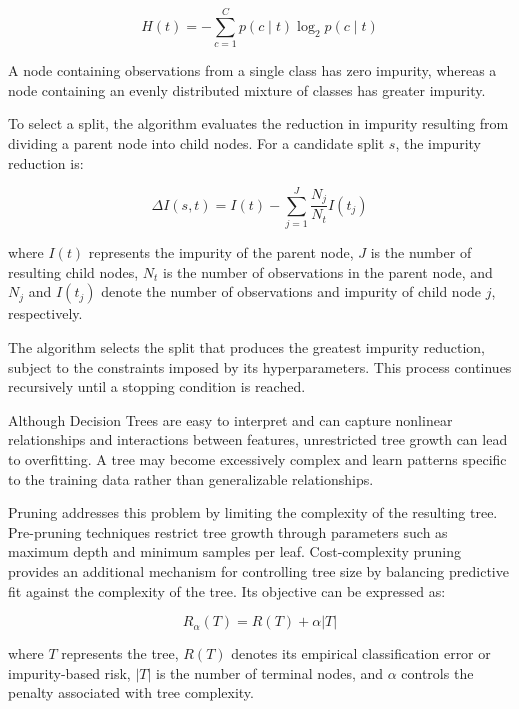 \begin{equation}
    H(t)
    =
    -\sum_{c=1}^{C}
    p(c\mid t)\log_2 p(c\mid t)
    \label{eq:entropy}
\end{equation}

A node containing observations from a single class has zero impurity, whereas a node containing an evenly distributed mixture of classes has greater impurity.

To select a split, the algorithm evaluates the reduction in impurity resulting from dividing a parent node into child nodes. For a candidate split $s$, the impurity reduction is:

\begin{equation}
    \Delta I(s,t)
    =
    I(t)
    -
    \sum_{j=1}^{J}
    \frac{N_j}{N_t}I(t_j)
    \label{eq:impurity-reduction}
\end{equation}

where $I(t)$ represents the impurity of the parent node, $J$ is the number of resulting child nodes, $N_t$ is the number of observations in the parent node, and $N_j$ and $I(t_j)$ denote the number of observations and impurity of child node $j$, respectively.

The algorithm selects the split that produces the greatest impurity reduction, subject to the constraints imposed by its hyperparameters. This process continues recursively until a stopping condition is reached.

Although Decision Trees are easy to interpret and can capture nonlinear relationships and interactions between features, unrestricted tree growth can lead to overfitting. A tree may become excessively complex and learn patterns specific to the training data rather than generalizable relationships.

Pruning addresses this problem by limiting the complexity of the resulting tree. Pre-pruning techniques restrict tree growth through parameters such as maximum depth and minimum samples per leaf. Cost-complexity pruning provides an additional mechanism for controlling tree size by balancing predictive fit against the complexity of the tree. Its objective can be expressed as:

\begin{equation}
    R_{\alpha}(T)
    =
    R(T)+\alpha |T|
    \label{eq:cost-complexity}
\end{equation}

where $T$ represents the tree, $R(T)$ denotes its empirical classification error or impurity-based risk, $|T|$ is the number of terminal nodes, and $\alpha$ controls the penalty associated with tree complexity.

